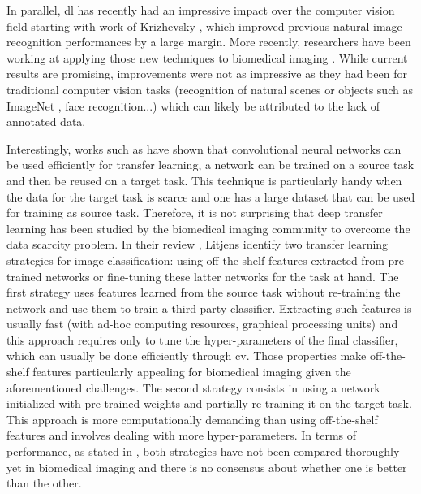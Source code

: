 In parallel, \acrshort{dl} has recently had an impressive impact over the computer vision field starting with work of Krizhevsky \etal \parencite{krizhevsky2012imagenet}, which improved previous natural image recognition performances by a large margin. More recently, researchers have been working at applying those new techniques to biomedical imaging \parencite{greenspan2016guest,litjens2017survey}. While current results are promising, improvements were not as impressive as they had been for traditional computer vision tasks (recognition of natural scenes or objects such as ImageNet \parencite{deng2009imagenet}, face recognition...) which can likely be attributed to the lack of annotated data.

Interestingly, works such as \parencite{donahue2014decaf,yosinski2014transferable,sermanet2013overfeat} have shown that convolutional neural networks can be used efficiently for transfer learning, \ie a network can be trained on a source task and then be reused on a target task. This technique is particularly handy when the data for the target task is scarce and one has a large dataset that can be used for training as source task. Therefore, it is not surprising that deep transfer learning has been studied by the biomedical imaging community to overcome the data scarcity problem. In their review \parencite{litjens2017survey}, Litjens \etal identify two transfer learning strategies for image classification: using off-the-shelf features extracted from pre-trained networks or fine-tuning these latter networks for the task at hand. The first strategy uses features learned from the source task without re-training the network and use them to train a third-party classifier. Extracting such features is usually fast (with ad-hoc computing resources, \ie graphical processing units) and this approach requires only to tune the hyper-parameters of the final classifier, which can usually be done efficiently through \acrlong{cv}. Those properties make off-the-shelf features particularly appealing for biomedical imaging given the aforementioned challenges. The second strategy consists in using a network initialized with pre-trained weights and partially re-training it on the target task. This approach is more computationally demanding than using off-the-shelf features and involves dealing with more hyper-parameters. In terms of performance, as stated in \parencite{litjens2017survey}, both strategies have not been compared thoroughly yet in biomedical imaging and there is no consensus about whether one is better than the other.

